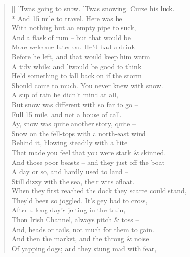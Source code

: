 \documentclass[MAIN]{subfiles}
\begin{document}
\settowidth{\versewidth}{When they first reached the dock they scarce could stand,}
\begin{verse}[\versewidth]
'Twas going to snow. 'Twas snowing. Curse his luck.\\*
And 15 mile to travel. Here was he\\
With nothing but an empty pipe to suck,\\
And  a flask of rum -- but that would be\\
More welcome later on. He'd had a drink\\
Before he left, and that would keep him warm\\
A tidy while; and 'twould be good to think\\
He'd something to fall back on if the storm\\
Should come to much. You never knew with snow.\\
A sup of rain he didn't mind at all,\\
But snow was different with so far to go --\\
Full 15 mile, and not a house of call.\\
Ay, snow was quite another story, quite --\\
Snow on the fell-tops with a north-east wind\\
Behind it, blowing steadily with a bite\\
That made you feel that you were stark \& skinned.\\
And those poor beasts -- and they just off the boat\\
A day or so, and hardly used to land --\\
Still dizzy with the sea, their wits afloat.\\
When they first reached the dock they scarce could stand,\\
They'd been so joggled. It's gey bad to cross,\\
After a long day's jolting in the train,\\
Thon Irish Channel, always pitch \& toss --\\
And, heads or tails, not much for them to gain.\\
And then the market, and the throng \& noise\\
Of yapping dogs; and they stung mad with fear,\\

\end{verse}
\end{document}
